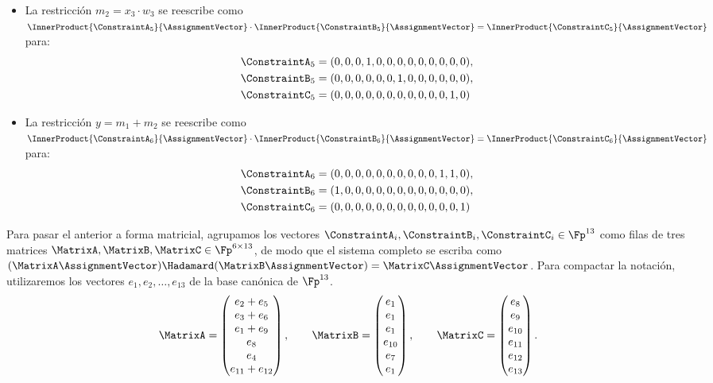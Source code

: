 \begin{itemize}
	\item La restricción $m_2 = x_3 \cdot w_3$ se reescribe como $\InnerProduct{\ConstraintA_5}{\AssignmentVector} \cdot \InnerProduct{\ConstraintB_5}{\AssignmentVector} = \InnerProduct{\ConstraintC_5}{\AssignmentVector}$para:
	$$\begin{aligned}
		\ConstraintA_5 &= (0, 0, 0, 1, 0, 0, 0, 0, 0, 0, 0, 0, 0), \\
		\ConstraintB_5 &= (0, 0, 0, 0, 0, 0, 1, 0, 0, 0, 0, 0, 0), \\
		\ConstraintC_5 &= (0, 0, 0, 0, 0, 0, 0, 0, 0, 0, 0, 1, 0)
	\end{aligned}$$
	\item La restricción $y = m_1 + m_2$ se reescribe como $\InnerProduct{\ConstraintA_6}{\AssignmentVector} \cdot \InnerProduct{\ConstraintB_6}{\AssignmentVector} = \InnerProduct{\ConstraintC_6}{\AssignmentVector}$ para:
	$$\begin{aligned}
		\ConstraintA_6 &= (0, 0, 0, 0, 0, 0, 0, 0, 0, 0, 1, 1, 0), \\
		\ConstraintB_6 &= (1, 0, 0, 0, 0, 0, 0, 0, 0, 0, 0, 0, 0), \\
		\ConstraintC_6 &= (0, 0, 0, 0, 0, 0, 0, 0, 0, 0, 0, 0, 1)
	\end{aligned}$$
\end{itemize}

Para pasar el \ROneCS anterior a forma matricial, agrupamos los vectores $\ConstraintA_i, \ConstraintB_i, \ConstraintC_i \in \Fp^{13}$ como filas de tres matrices $\MatrixA, \MatrixB, \MatrixC \in \Fp^{6 \times 13}$, de modo que el sistema completo se escriba como $(\MatrixA\AssignmentVector) \Hadamard (\MatrixB\AssignmentVector) = \MatrixC\AssignmentVector$. Para compactar la notación, utilizaremos los vectores $e_1, e_2, \ldots, e_{13}$ de la base canónica de $\Fp^{13}$.
$$\begin{aligned}
	\MatrixA = \begin{pmatrix}
		e_2 + e_5 \\
		e_3 + e_6 \\
		e_1 + e_9 \\
		e_8 \\
		e_4 \\
		e_{11} + e_{12}
	\end{pmatrix},
	\qquad
	\MatrixB =
	\begin{pmatrix}
		e_1 \\
		e_1 \\
		e_1 \\
		e_{10} \\
		e_7 \\
		e_1
	\end{pmatrix},
	\qquad
	\MatrixC =
	\begin{pmatrix}
		e_8 \\
		e_9 \\
		e_{10} \\
		e_{11} \\
		e_{12} \\
		e_{13}
	\end{pmatrix}.
\end{aligned}$$

